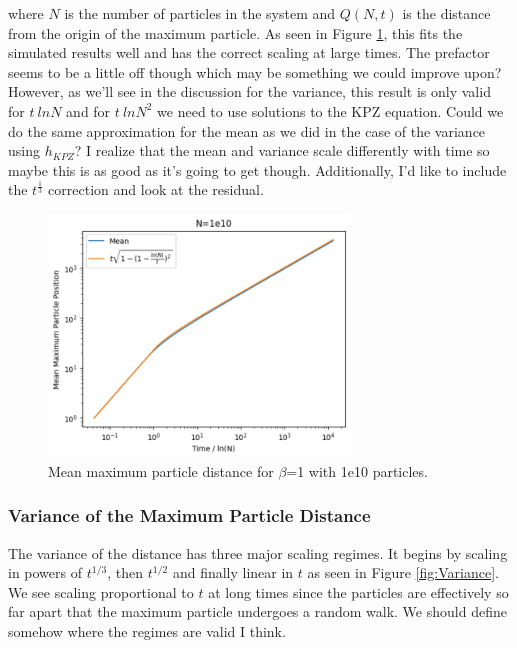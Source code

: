 \documentclass{article}
\begin{document}
 where $N$ is the number of particles in the system and $Q(N, t)$ is the distance from the origin of the maximum particle. As seen in Figure \ref{fig:Mean}, this fits the simulated results well and has the correct scaling at large times. The prefactor seems to be a little off though which may be something we could improve upon? However, as we'll see in the discussion for the variance, this result is only valid for $t~lnN$ and for $t~lnN^2$ we need to use solutions to the KPZ equation. Could we do the same approximation for the mean as we did in the case of the variance using $h_{KPZ}$? I realize that the mean and variance scale differently with time so maybe this is as good as it's going to get though. Additionally, I'd like to include the $t^{\frac{1}{3}}$ correction and look at the residual. 

\begin{figure}[h]
\centering
\includegraphics[width=8cm]{MaxMean1e10}
\caption{Mean maximum particle distance for $\beta$=1 with 1e10 particles.} 
\label{fig:Mean} 
\end{figure}

\subsubsection{Variance of the Maximum Particle Distance}
\indent\indent The variance of the distance has three major scaling regimes. It begins by scaling in powers of $t^{1/3}$, then $t^{1/2}$ and finally linear in $t$ as seen in Figure \ref{fig:Variance}. We see scaling proportional to $t$ at long times since the particles are effectively so far apart that the maximum particle undergoes a random walk. We should define somehow where the regimes are valid I think. 
\end{document}
